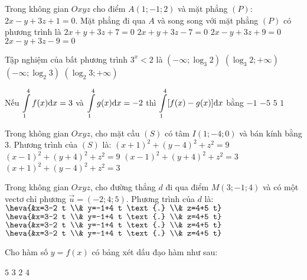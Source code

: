 \begin{ex}%
Trong không gian $O x y z$ cho điểm $A(1;-1; 2)$ và mặt phẳng $(P)$: $2 x-y+3 z+1=0$. Mặt phẳng đi qua $A$ và song song với mặt phẳng $(P)$ có phương trình là
\choice
{$2 x+y+3 z+7=0$}
{$2 x+y+3 z-7=0$}
{$2 x-y+3 z+9=0$}
{\True $2 x-y+3 z-9=0$}

\end{ex}
\begin{ex}%
Tập nghiệm của bất phương trình $3^{x}<2$ là
\choice
{\True $\left(-\infty; \log_3 2\right)$}
{$\left(\log_3 2;+\infty\right)$}
{$\left(-\infty; \log_2 3\right)$}
{$\left(\log_2 3;+\infty\right)$}

\end{ex}
\begin{ex}%
Nếu $\displaystyle\displaystyle\int\limits_1^4 f(x) \mathrm{d} x=3$ và $\displaystyle\displaystyle\int\limits_1^4 g(x) \mathrm{d} x=-2$ thì $\displaystyle\displaystyle\int\limits_1^4[f(x)-g(x)] \mathrm{d} x$ bằng
\choice
{$-1$}
{$-5$}
{\True $5$}
{$1$}

\end{ex}
\begin{ex}%
Trong không gian $O x y z$, cho mặt cầu $(S)$ có tâm $I(1;-4; 0)$ và bán kính bằng $3$. Phương trình của $(S)$ là:
\choice
{$(x+1)^2+(y-4)^2+z^2=9$}
{\True $(x-1)^2+(y+4)^2+z^2=9$}
{$(x-1)^2+(y+4)^2+z^2=3$}
{$(x+1)^2+(y-4)^2+z^2=3$}

\end{ex}
\begin{ex}%
Trong không gian $O x y z$, cho đường thẳng $d$ đi qua điểm $M(3;-1; 4)$ và có một vectơ chỉ phương $\vec{u}=(-2; 4; 5)$. Phương trình của $d$ là:
\choice
{$\heva{&x=3-2 t \\& y=-1+4 t \text {.} \\& z=4+5 t}$}
{$\heva{&x=3-2 t \\& y=-1+4 t \text {.} \\& z=4+5 t}$}
{$\heva{&x=3-2 t \\& y=-1+4 t \text {.} \\& z=4+5 t}$}
{\True $\heva{&x=3-2 t \\& y=-1+4 t \text {.} \\& z=4+5 t}$}

\end{ex}
\begin{ex}%
Cho hàm số $y=f(x)$ có bảng xét dấu đạo hàm như sau:
{
}
\choice
{$5$}
{$3$}
{$2$}
{\True $4$}
\end{ex}
